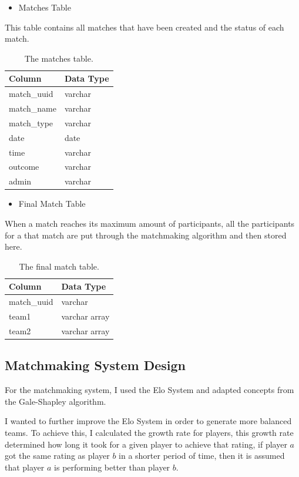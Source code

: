 \begin{itemize}
	\item Matches Table
\end{itemize}
This table contains all matches that have been created and the status of each match.
\begin{table}[h]
	\centering
	\begin{tabular}{ll}
		\toprule
		Column         & Data Type \\
		\midrule
		match\_uuid & varchar   \\
		match\_name & varchar   \\
		match\_type & varchar   \\
		date        & date      \\
		time        & varchar   \\
		outcome     & varchar   \\
		admin       & varchar   \\
		\bottomrule    
	\end{tabular}
	\caption{The matches table.}
\end{table}

\newpage
\begin{itemize}
	\item Final Match Table
\end{itemize}
When a match reaches its maximum amount of participants, all the participants for a that match are put through the matchmaking algorithm and then stored here. 
\begin{table}[h]
	\centering
	\begin{tabular}{ll}
		\toprule
		Column         & Data Type \\
		\midrule
		match\_uuid & varchar       \\
		team1       & varchar array \\
		team2       & varchar array \\
		\bottomrule    
	\end{tabular}
	\caption{The final match table.}
\end{table}

\subsection{Matchmaking System Design}
For the matchmaking system, I used the Elo System and adapted concepts from the Gale-Shapley algorithm.

I wanted to further improve the Elo System in order to generate more balanced teams.\newline
To achieve this, I calculated the growth rate \cite{d2010production} for players, this growth rate determined how long it took for a given player to achieve that rating, if player $a$ got the same rating as player $b$ in a shorter period of time, then it is assumed that player $a$ is performing better than player $b$.



